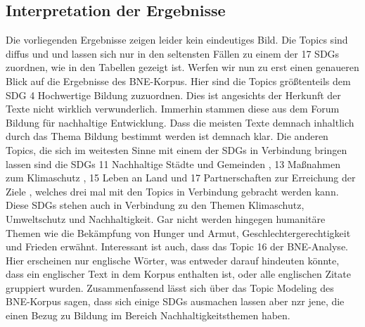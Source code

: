 \documentclass[letterpaper]{article}
\begin{document}
\subsection{Interpretation der Ergebnisse}
Die vorliegenden Ergebnisse zeigen leider kein eindeutiges Bild. Die Topics sind diffus und und lassen sich nur in den seltensten Fällen zu einem der 17 SDGs zuordnen, wie in den Tabellen gezeigt ist. Werfen wir nun zu erst einen genaueren Blick auf die Ergebnisse des BNE-Korpus. Hier sind die Topics größtenteils dem SDG 4 \glqq  Hochwertige Bildung\grqq{} zuzuordnen. Dies ist angesichts der Herkunft der Texte nicht wirklich verwunderlich. Immerhin stammen diese aus dem Forum Bildung für nachhaltige Entwicklung. Dass die meisten Texte demnach inhaltlich durch das Thema Bildung bestimmt werden ist demnach klar. Die anderen Topics, die sich im weitesten Sinne mit einem der SDGs in Verbindung bringen lassen sind die SDGs 11 \glqq Nachhaltige Städte und Gemeinden \grqq{}, 13 \glqq Maßnahmen zum Klimaschutz \grqq{}, 15 \glqq Leben an Land \grqq{} und 17 \glqq Partnerschaften zur Erreichung der Ziele \grqq{}, welches drei mal mit den Topics in Verbindung gebracht werden kann. Diese SDGs stehen auch in Verbindung zu den Themen Klimaschutz, Umweltschutz und Nachhaltigkeit. Gar nicht werden hingegen humanitäre Themen wie die Bekämpfung von Hunger und Armut, Geschlechtergerechtigkeit und Frieden erwähnt. Interessant ist auch, dass das Topic 16 der BNE-Analyse. Hier erscheinen nur englische Wörter, was entweder darauf hindeuten könnte, dass ein englischer Text in dem Korpus enthalten ist, oder alle englischen Zitate gruppiert wurden. Zusammenfassend lässt sich über das Topic Modeling des BNE-Korpus sagen, dass sich einige SDGs ausmachen lassen aber nzr jene, die einen Bezug zu Bildung im Bereich Nachhaltigkeitsthemen haben.\\
\end{document}
